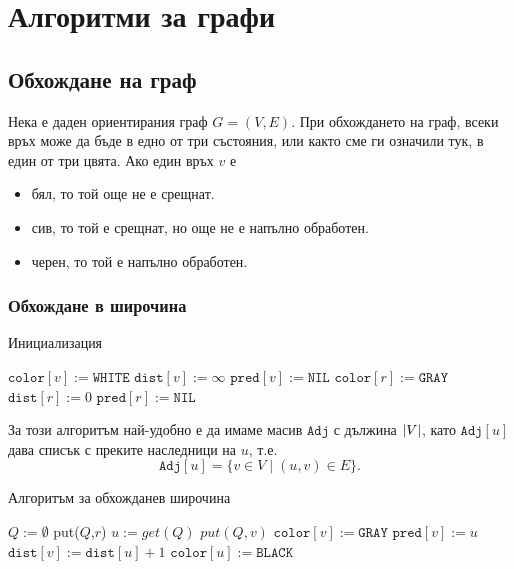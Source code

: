 \chapter {Алгоритми за графи}

\section{Обхождане на граф}

Нека е даден ориентирания граф $G = (V,E)$.
При обхождането на граф, всеки връх може да бъде в едно от три състояния, или както сме ги означили тук, в един от три цвята.
Ако един връх $v$ е
\begin{itemize}
\item 
  бял, то той още не е срещнат.
\item
  сив, то той е срещнат, но още не е напълно обработен.
\item
  черен, то той е напълно обработен.
\end{itemize}


\subsection{Обхождане в широчина}


\begin{algorithm}
  \caption{Инициализация}
  \label{alg:bfs-init}
  \begin{algorithmic}[1]
    \State $\texttt{color}[v] := \texttt{WHITE}$
    \State $\texttt{dist}[v] := \infty$
    \State $\texttt{pred}[v] := \texttt{NIL}$
    \EndFor
    \State $\texttt{color}[r]:= \texttt{GRAY}$
    \State $\texttt{dist}[r]:= 0$
    \State $\texttt{pred}[r]:= \texttt{NIL}$
    \EndProcedure
  \end{algorithmic}
\end{algorithm}

За този алгоритъм най-удобно е да имаме масив $\texttt{Adj}$ с дължина $\lvert{V}\rvert$,
като $\texttt{Adj}[u]$ дава списък с преките наследници на $u$, т.е.
\[\texttt{Adj}[u] = \{v \in V \mid (u,v) \in E\}.\]

\begin{algorithm}[H]
  \caption{Алгоритъм за обхожданев широчина}
  \label{alg:bfs}
  \begin{algorithmic}[1]
    \State {}
    \State $Q := \emptyset$
    \State put($Q$,$r$)
    \State $u := get(Q)$
    \State $put(Q,v)$
    \State $\texttt{color}[v] := \texttt{GRAY}$
    \State $\texttt{pred}[v] := u$
    \State $\texttt{dist}[v] := \texttt{dist}[u] + 1$
    \EndIf
    \EndFor
    \State $\texttt{color}[u] := \texttt{BLACK}$
    \EndWhile
    \EndProcedure
  \end{algorithmic}
\end{algorithm}

